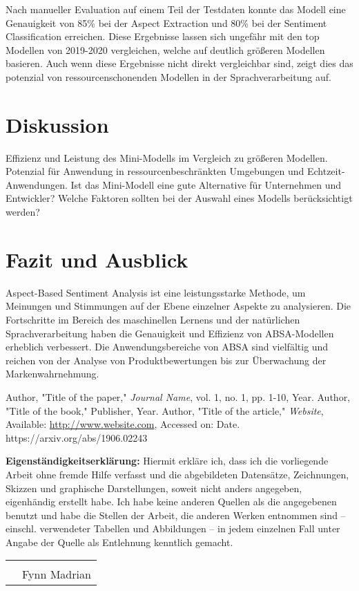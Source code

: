 \documentclass[12pt]{article}
\begin{document}
Nach manueller Evaluation auf einem Teil der Testdaten konnte das Modell eine Genauigkeit von 85\% bei der Aspect Extraction und 80\% bei der Sentiment Classification erreichen. Diese Ergebnisse lassen sich ungefähr mit den top Modellen von 2019-2020 vergleichen, welche auf deutlich größeren Modellen basieren. Auch wenn diese Ergebnisse nicht direkt vergleichbar sind, zeigt dies das potenzial von ressourcenschonenden Modellen in der Sprachverarbeitung auf.

\section{Diskussion}
Effizienz und Leistung des Mini-Modells im Vergleich zu größeren Modellen. Potenzial für Anwendung in ressourcenbeschränkten Umgebungen und Echtzeit-Anwendungen.
Ist das Mini-Modell eine gute Alternative für Unternehmen und Entwickler? Welche Faktoren sollten bei der Auswahl eines Modells berücksichtigt werden?

\section{Fazit und Ausblick}
Aspect-Based Sentiment Analysis ist eine leistungsstarke Methode, um Meinungen und Stimmungen auf der Ebene einzelner Aspekte zu analysieren.
Die Fortschritte im Bereich des maschinellen Lernens und der natürlichen Sprachverarbeitung haben die Genauigkeit und Effizienz von ABSA-Modellen 
erheblich verbessert. Die Anwendungsbereiche von ABSA sind vielfältig und reichen von der Analyse von Produktbewertungen bis zur Überwachung der 
Markenwahrnehmung.
\begin{thebibliography}{9}
 Author, "Title of the paper," \textit{Journal Name}, vol. 1, no. 1, pp. 1-10, Year.
 Author, "Title of the book," Publisher, Year.
 Author, "Title of the article," \textit{Website}, Available: \url{http://www.website.com}, Accessed on: Date.
https://arxiv.org/abs/1906.02243
\end{thebibliography}
\newpage

\textbf{Eigenständigkeitserklärung:}
\newline
\newline
Hiermit erkläre ich, dass ich die vorliegende Arbeit ohne fremde Hilfe verfasst und die abgebildeten Datensätze,
Zeichnungen, Skizzen und graphische Darstellungen, soweit nicht anders angegeben, eigenhändig erstellt habe.
Ich habe keine anderen Quellen als die angegebenen benutzt und habe die Stellen der Arbeit, die anderen
Werken entnommen sind – einschl. verwendeter Tabellen und Abbildungen – in jedem einzelnen Fall unter
Angabe der Quelle als Entlehnung kenntlich gemacht.
\newline
\newline
\newline
\newline
\begin{tabular}{@{}p{.5in}p{4in}@{}}
& \hrulefill \\
& Fynn Madrian\\
\end{tabular}
\end{document}
